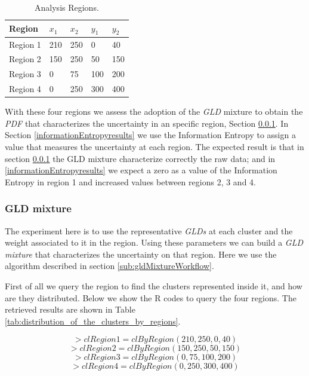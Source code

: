 \begin{table}
\begin{center}
    \begin{tabular}{|l|l|l|l|l|}
    \hline
    \textbf{Region} & $x_{1}$ & $x_{2}$ & $y_{1}$ & $y_{2}$        \\ \hline
    Region 1     & 210 & 250 & 0 & 40              \\ \hline
    Region 2     & 150 & 250 & 50 & 150           \\ \hline
    Region 3     & 0 & 75 & 100 & 200            \\ \hline
    Region 4     & 0 & 250 & 300 & 400               \\ \hline
    \end{tabular}
    \caption {Analysis Regions.}
    \label{tab:analysis_regions}
    \end{center}
\end{table}

With these four regions we assess the adoption of the \textit{GLD} mixture to obtain the \textit{PDF} that characterizes the uncertainty in an specific region, Section \ref{GLDmixtureresults}. In Section \ref{informationEntropyresults} we use the Information Entropy to assign a value that measures the uncertainty at each region. The expected result is that in section \ref{GLDmixtureresults} the GLD mixture characterize correctly the raw data; and in \ref{informationEntropyresults} we expect a zero as a value of the Information Entropy in region 1 and increased values between regions 2, 3 and 4.

\subsubsection{GLD mixture}\label{GLDmixtureresults}
The experiment here is to use the representative \textit{GLDs} at each cluster and the weight associated to it in the region. Using these parameters we can build a \textit{GLD mixture} that characterizes the uncertainty on that region. Here we use the algorithm described in section \ref{sub:gldMixtureWorkflow}.

First of all we query the region to find  the clusters represented inside it, and how are they distributed. Below we show the R codes to query the four regions. The retrieved results are shown in Table \ref{tab:distribution_of_the_clusters_by_regions}.

\begin{equation*}
> clRegion1 = clByRegion(210, 250, 0, 40)
\end{equation*}
\begin{equation*}
> clRegion2 = clByRegion(150, 250, 50, 150)
\end{equation*}
\begin{equation*}
> clRegion3 = clByRegion(0, 75, 100, 200)
\end{equation*}
\begin{equation*}
> clRegion4 = clByRegion(0, 250, 300, 400)
\end{equation*}

